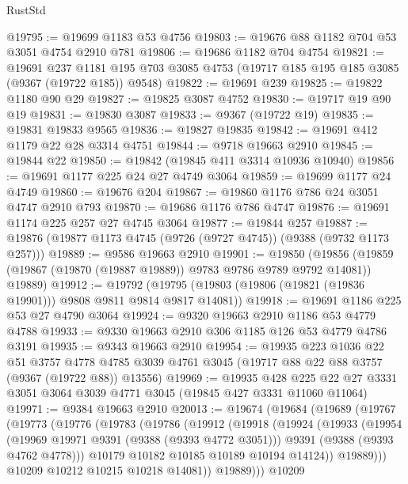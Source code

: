 \begin{lexlean}{RustStd}
\begin{coremodule}
@19795 := @19699 @1183 @53 @4756
@19803 := @19676 @88 @1182 @704 @53 @3051 @4754 @2910 @781
@19806 := @19686 @1182 @704 @4754
@19821 := @19691
    @237
    @1181
    @195
    @703
    @3085
    @4753
    (@19717 @185 @195 @185 @3085 (@9367 (@19722 @185)) @9548)
@19822 := @19691 @239
@19825 := @19822 @1180 @90 @29
@19827 := @19825 @3087 @4752
@19830 := @19717 @19 @90 @19
@19831 := @19830 @3087
@19833 := @9367 (@19722 @19)
@19835 := @19831 @19833 @9565
@19836 := @19827 @19835
@19842 := @19691 @412 @1179 @22 @28 @3314 @4751
@19844 := @9718 @19663 @2910
@19845 := @19844 @22
@19850 := @19842 (@19845 @411 @3314 @10936 @10940)
@19856 := @19691 @1177 @225 @24 @27 @4749 @3064
@19859 := @19699 @1177 @24 @4749
@19860 := @19676 @204
@19867 := @19860 @1176 @786 @24 @3051 @4747 @2910 @793
@19870 := @19686 @1176 @786 @4747
@19876 := @19691 @1174 @225 @257 @27 @4745 @3064
@19877 := @19844 @257
@19887 := @19876 (@19877 @1173 @4745 (@9726 (@9727 @4745)) (@9388 (@9732 @1173 @257)))
@19889 := @9586 @19663 @2910
@19901 := @19850
    (@19856 (@19859 (@19867 (@19870 (@19887 @19889)) @9783 @9786 @9789 @9792 @14081)) @19889)
@19912 := @19792 (@19795 (@19803 (@19806 (@19821 (@19836 @19901))) @9808 @9811 @9814 @9817 @14081))
@19918 := @19691 @1186 @225 @53 @27 @4790 @3064
@19924 := @9320 @19663 @2910 @1186 @53 @4779 @4788
@19933 := @9330 @19663 @2910 @306 @1185 @126 @53 @4779 @4786 @3191
@19935 := @9343 @19663 @2910
@19954 := @19935
    @223
    @1036
    @22
    @51
    @3757
    @4778
    @4785
    @3039
    @4761
    @3045
    (@19717 @88 @22 @88 @3757 (@9367 (@19722 @88)) @13556)
@19969 := @19935
    @428
    @225
    @22
    @27
    @3331
    @3051
    @3064
    @3039
    @4771
    @3045
    (@19845 @427 @3331 @11060 @11064)
@19971 := @9384 @19663 @2910
@20013 := @19674
    (@19684
      (@19689
        (@19767
          (@19773
            (@19776
              (@19783
                (@19786
                  (@19912
                    (@19918
                      (@19924
                        (@19933
                          (@19954
                            (@19969 @19971 @9391 (@9388 (@9393 @4772 @3051)))
                            @9391
                            (@9388 (@9393 @4762 @4778)))
                          @10179
                          @10182
                          @10185
                          @10189
                          @10194
                          @14124))
                      @19889)))
                @10209
                @10212
                @10215
                @10218
                @14081))
            @19889)))
      @10209

\end{coremodule}
\end{lexlean}
